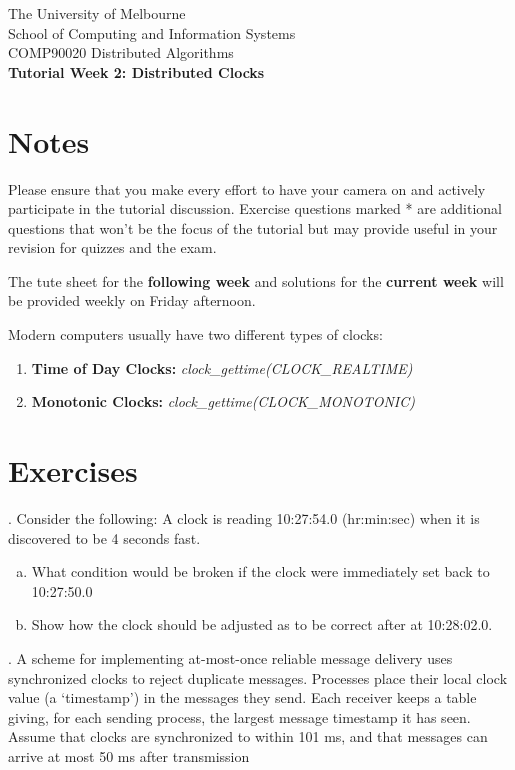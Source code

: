 \documentclass[12pt]{article}
\newcounter{question}
\newcommand{\question}[1]{
    \stepcounter{question}
    \thequestion. #1 \hfill
}
\begin{document}
\begin{center}
{\sc The University of Melbourne
\\
School of Computing and Information Systems
\\ 
COMP90020 Distributed Algorithms}
\bigskip \\
{\Large\bf Tutorial Week 2: Distributed Clocks}
\bigskip \\
\end{center}
\section*{Notes}
Please ensure that you make every effort to have your camera on and actively participate in the tutorial discussion. Exercise questions marked * are additional questions that won't be the focus of the tutorial but may provide useful in your revision for quizzes and the exam. 

The tute sheet for the \textbf{following week} and solutions for the \textbf{current week} will be provided weekly on Friday afternoon.

Modern computers usually have two different types of clocks:

\begin{enumerate}
    \item \textbf{Time of Day Clocks:} \textit{clock\_gettime(CLOCK\_REALTIME)}
    \item \textbf{Monotonic Clocks:}  \textit{clock\_gettime(CLOCK\_MONOTONIC)}
\end{enumerate}

\section*{Exercises}

\question{Consider the following: A clock is reading 10:27:54.0 (hr:min:sec) when it is discovered to be 4 seconds fast.}

\begin{enumerate}[(a)]
\item What condition would be broken if the clock were immediately set back to 10:27:50.0
\item Show how the clock should be adjusted as to be correct after at 10:28:02.0.
\end{enumerate}

\question{A scheme for implementing at-most-once reliable message delivery uses synchronized clocks to reject duplicate messages. Processes place their local clock value (a ‘timestamp’) in the messages they send. Each receiver keeps a table giving, for each sending process, the largest message timestamp it has seen. Assume that clocks are synchronized to within 101 ms, and that messages can arrive at most 50 ms after transmission}
\end{document}
